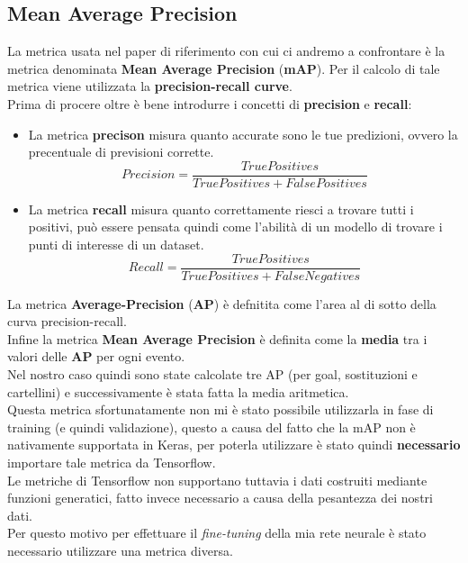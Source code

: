 \subsection{Mean Average Precision}
La metrica usata nel paper di riferimento con cui ci andremo a confrontare è la metrica denominata \textbf{Mean Average Precision} (\textbf{mAP}). Per il calcolo di tale metrica viene utilizzata la \textbf{precision-recall curve}.
\\Prima di procere oltre è bene introdurre i concetti di \textbf{precision} e \textbf{recall}:
\begin{itemize}
\item La metrica \textbf{precison} misura quanto accurate sono le tue predizioni, ovvero la precentuale di previsioni corrette.
\begin{equation}
Precision=\frac{True Positives}{True Positives + False Positives}
\label{Precision}
\end{equation}
\item La metrica \textbf{recall} misura quanto correttamente riesci a trovare tutti i positivi, può essere pensata quindi come l'abilità di un modello di trovare i punti di interesse di un dataset.
\begin{equation}
Recall=\frac{True Positives}{True Positives + False Negatives}
\label{Recall}
\end{equation}
\end{itemize}
La metrica \textbf{Average-Precision} (\textbf{AP}) è defnitita come l'area al di sotto della curva precision-recall.
\\Infine la metrica \textbf{Mean Average Precision} è definita come la \textbf{media} tra i valori delle \textbf{AP} per ogni evento. 
\\Nel nostro caso quindi sono state calcolate tre AP (per goal, sostituzioni e cartellini) e successivamente è stata fatta la media aritmetica.
\\Questa metrica sfortunatamente non mi è stato possibile utilizzarla in fase di training (e quindi validazione), questo a causa del fatto che la mAP non è nativamente supportata in Keras, per poterla utilizzare è stato quindi \textbf{necessario} importare tale metrica da Tensorflow.
\\Le metriche di Tensorflow non supportano tuttavia i dati costruiti mediante funzioni generatici, fatto invece necessario a causa della pesantezza dei nostri dati.
\\Per questo motivo per effettuare il \textit{fine-tuning} della mia rete neurale è stato necessario utilizzare una metrica diversa.
